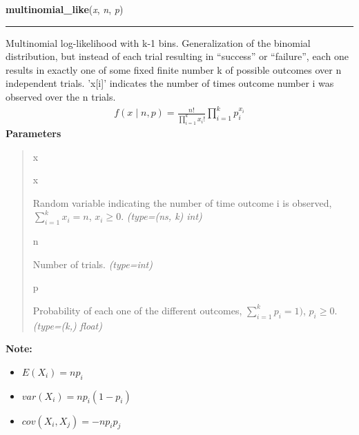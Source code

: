 \hspace{.8\funcindent}\begin{boxedminipage}{\funcwidth}

    \raggedright \textbf{multinomial\_like}(\textit{x}, \textit{n}, \textit{p})

    \vspace{-1.5ex}

    \rule{\textwidth}{0.5\fboxrule}
\setlength{\parskip}{2ex}

Multinomial log-likelihood with k-1 bins. Generalization of the binomial
distribution, but instead of each trial resulting in ``success'' or
``failure'', each one results in exactly one of some fixed finite number k
of possible outcomes over n independent trials. 'x{[}i{]}' indicates the number
of times outcome number i was observed over the n trials.
\begin{equation*}\begin{split}f(x \mid n, p) = \frac{n!}{\prod_{i=1}^k x_i!} \prod_{i=1}^k p_i^{x_i}\end{split}\end{equation*}\setlength{\parskip}{1ex}
      \textbf{Parameters}
      \vspace{-1ex}

      \begin{quote}
        \begin{Ventry}{x}

          \item[x]


Random variable indicating the number of time outcome i is observed,
$\sum_{i=1}^k x_i=n$, $x_i \ge 0$.
            {\it (type=(ns, k) int)}

          \item[n]


Number of trials.
            {\it (type=int)}

          \item[p]


Probability of each one of the different outcomes,
$\sum_{i=1}^k p_i = 1)$, $p_i \ge 0$.
            {\it (type=(k,) float)}

        \end{Ventry}

      \end{quote}

\textbf{Note:} \begin{itemize}
\item {} 
$E(X_i)=n p_i$

\item {} 
$var(X_i)=n p_i(1-p_i)$

\item {} 
$cov(X_i,X_j) = -n p_i p_j$

\end{itemize}


    \end{boxedminipage}

